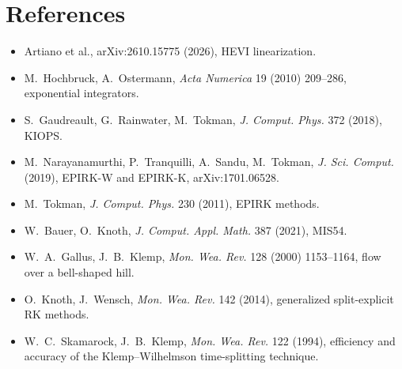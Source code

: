 \documentclass[11pt,a4paper]{article}
\begin{document}
\section*{References}
\begin{itemize}
\item Artiano et al., arXiv:2610.15775 (2026), HEVI linearization.
\item M.~Hochbruck, A.~Ostermann, \emph{Acta Numerica} 19 (2010) 209--286, exponential integrators.
\item S.~Gaudreault, G.~Rainwater, M.~Tokman, \emph{J. Comput. Phys.} 372 (2018), KIOPS.
\item M.~Narayanamurthi, P.~Tranquilli, A.~Sandu, M.~Tokman, \emph{J. Sci. Comput.} (2019), EPIRK-W and EPIRK-K, arXiv:1701.06528.
\item M.~Tokman, \emph{J. Comput. Phys.} 230 (2011), EPIRK methods.
\item W.~Bauer, O.~Knoth, \emph{J. Comput. Appl. Math.} 387 (2021), MIS54.
\item W.~A.~Gallus, J.~B.~Klemp, \emph{Mon. Wea. Rev.} 128 (2000) 1153--1164, flow over a bell-shaped hill.
\item O.~Knoth, J.~Wensch, \emph{Mon. Wea. Rev.} 142 (2014), generalized split-explicit RK methods.
\item W.~C.~Skamarock, J.~B.~Klemp, \emph{Mon. Wea. Rev.} 122 (1994), efficiency and accuracy of the
  Klemp--Wilhelmson time-splitting technique.
\end{itemize}
\end{document}
